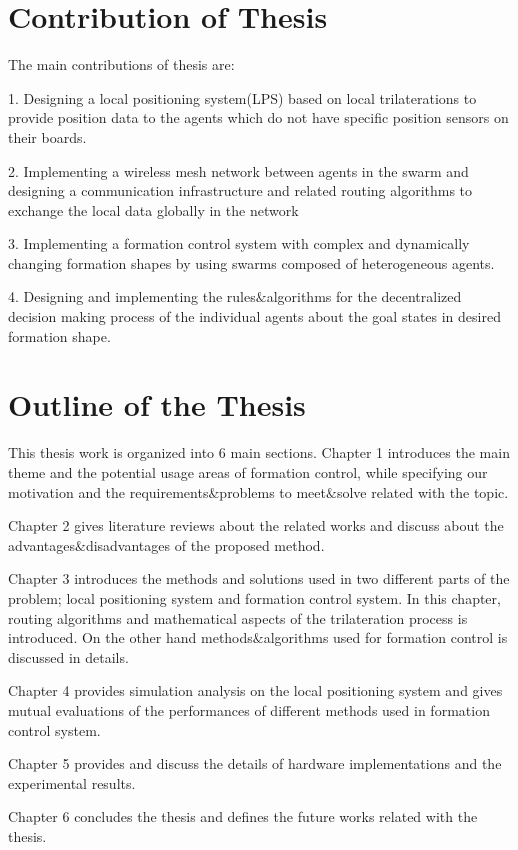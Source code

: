 \section{Contribution of Thesis}
The main contributions of thesis are:

1. Designing a local positioning system(LPS) based on local trilaterations to provide position data to the agents which do not have specific position sensors on their boards.

2. Implementing a wireless mesh network between agents in the swarm and designing a communication infrastructure and related routing algorithms to exchange the local data globally in the network

3. Implementing a formation control system with complex and dynamically changing formation shapes by using swarms composed of heterogeneous agents.

4. Designing and implementing the rules$\&$algorithms for the decentralized decision making process of the individual agents about the goal states in desired formation shape.


\section{Outline of the Thesis}
This thesis work is organized into 6 main sections. Chapter 1 introduces the main theme and the potential usage areas of formation control, while specifying our motivation and the requirements$\&$problems to meet$\&$solve related with the topic.

Chapter 2 gives literature reviews about the related works and discuss about the advantages$\&$disadvantages of the proposed method.

Chapter 3 introduces the methods and solutions used in two different parts of the problem; local positioning system and formation control system. In this chapter, routing algorithms and mathematical aspects of the trilateration process is introduced. On the other hand methods$\&$algorithms used for formation control is discussed in details.

Chapter 4 provides simulation analysis on the local positioning system and gives mutual evaluations of the performances of different methods used in formation control system.

Chapter 5 provides and discuss the details of hardware implementations and the experimental results.

Chapter 6 concludes the thesis and defines the future works related with the thesis.